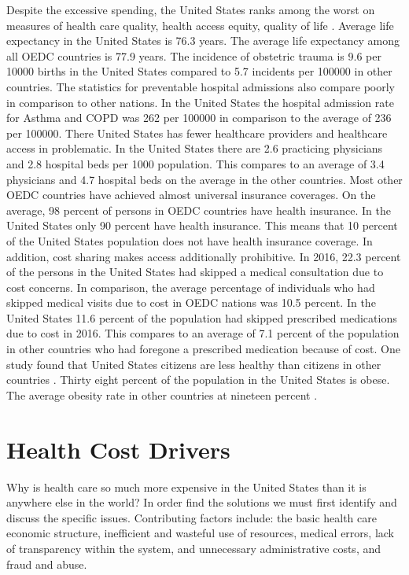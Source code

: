 \documentclass[sigconf]{acmart}
\begin{document}
Despite the excessive spending, the United States ranks among the worst on measures of health care quality, health access equity, quality of life \cite{www-google-McDonald}.  Average life expectancy in the United States is 76.3 years.  The average life expectancy among all OEDC countries is 77.9 years. The incidence of obstetric trauma is 9.6 per 10000 births in the United States compared to 5.7 incidents per 100000 in other countries. The statistics for preventable hospital admissions also compare poorly in comparison to other nations. In the United States the hospital admission rate for Asthma and COPD was 262 per 100000 in comparison to the average of 236 per 100000.  There United States has fewer healthcare providers and healthcare access in problematic.  In the United States there are 2.6 practicing physicians and 2.8 hospital beds per 1000 population. This compares to an average of 3.4 physicians and 4.7 hospital beds on the average in the other countries. Most other OEDC countries have achieved almost universal insurance coverages. On the average, 98 percent of persons in OEDC countries have health insurance. In the United States only 90 percent have health insurance. This means that 10 percent of the United States population does not have health insurance coverage. In addition, cost sharing makes access additionally prohibitive.  In 2016, 22.3 percent of the persons in the United States had skipped a medical consultation due to cost concerns. In comparison, the average percentage of individuals who had skipped medical visits due to cost in OEDC nations was 10.5 percent.  In the United States 11.6 percent of the population had skipped prescribed medications due to cost in 2016. This compares to an average of 7.1 percent of the population in other countries who had foregone a prescribed medication because of cost. One study found that United States citizens are less healthy than citizens in other countries \cite{milbank}.  Thirty eight percent of the population in the United States is obese. The average obesity rate in other countries at nineteen percent \cite{www-google-OEDC}.

\section{Health Cost Drivers}
Why is health care so much more expensive in the United States than it is anywhere else in the world?   In order find the solutions we must first identify and discuss the specific issues. Contributing factors include: the basic health care economic structure, inefficient and wasteful use of resources, medical errors, lack of transparency within the system, and unnecessary administrative costs, and fraud and abuse.
\end{document}
